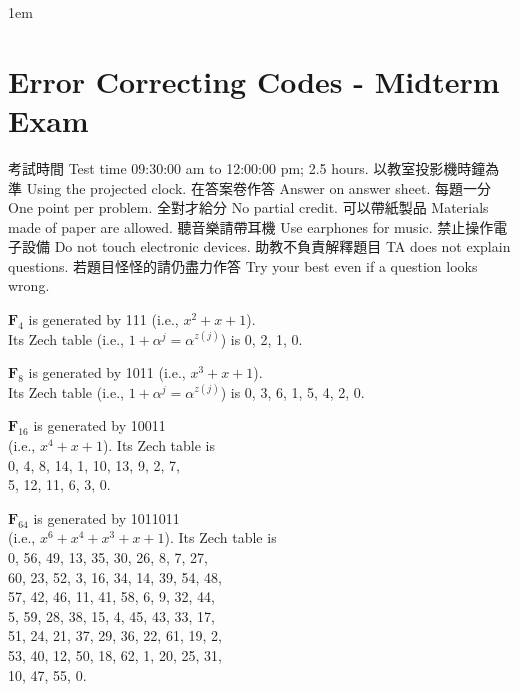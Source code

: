 \documentclass[a4paper]{article}
\def\FF{\mathbf F}
\begin{document}
\parindent 0pt
\parskip 1em

\def\answersheet{}
\def\addblank#1{\xdef\answersheet{\answersheet#1}}
\def\Problem#1{\stepcounter{p}[\thep]\addblank{[\thep]\hbox to#1{}\hskip0pt plus#1}}

\def\choice#1{%
    \stepcounter{c}\ifnum\value{c}=27\setcounter{c}{1}\fi%
    #1(\Alph{c})\nobreak\ 
}
\def\no{\choice{}}
\def\yes{\choice{}}

\section*{Error Correcting Codes - Midterm Exam}

\sffamily

考試時間 Test time 09:30:00 am to 12:00:00 pm; 2.5 hours.
以教室投影機時鐘為準 Using the projected clock.
在答案卷作答 Answer on answer sheet.
每題一分 One point per problem.
全對才給分 No partial credit.
可以帶紙製品 Materials made of paper are allowed.
聽音樂請帶耳機 Use earphones for music.
禁止操作電子設備 Do not touch electronic devices.
助教不負責解釋題目 TA does not explain questions.
若題目怪怪的請仍盡力作答 Try your best even if a question looks wrong.

\rmfamily

$\FF_{4}$ is generated by 111 (i.e., $x^2 + x + 1$). \\
Its Zech table (i.e., $1 + \alpha^j = \alpha^{z(j)}$) is
0, 2, 1, 0.

$\FF_{8}$ is generated by 1011 (i.e., $x^3 + x + 1$). \\
Its Zech table (i.e., $1 + \alpha^j = \alpha^{z(j)}$) is
0, 3, 6, 1, 5, 4, 2, 0.

$\FF_{16}$ is generated by 10011 \\
(i.e., $x^4 + x + 1$).
Its Zech table is \\
0, 4, 8, 14, 1, 10, 13, 9, 2, 7, \\
5, 12, 11, 6, 3, 0.

$\FF_{64}$ is generated by 1011011 \\
(i.e., $x^6 + x^4 + x^3 + x + 1$).
Its Zech table is \\
0, 56, 49, 13, 35, 30, 26, 8, 7, 27, \\
60, 23, 52, 3, 16, 34, 14, 39, 54, 48, \\
57, 42, 46, 11, 41, 58, 6, 9, 32, 44, \\
5, 59, 28, 38, 15, 4, 45, 43, 33, 17, \\
51, 24, 21, 37, 29, 36, 22, 61, 19, 2, \\
53, 40, 12, 50, 18, 62, 1, 20, 25, 31, \\
10, 47, 55, 0.
\end{document}

